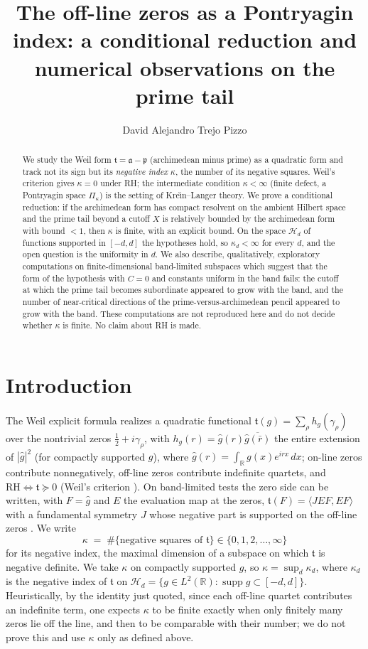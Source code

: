 \documentclass[11pt]{amsart}
\title[The Pontryagin-Index Route]{The off-line zeros as a Pontryagin index: a conditional reduction and numerical observations on the prime tail}
\author{David Alejandro Trejo Pizzo}
\theoremstyle{definition}
\theoremstyle{remark}
\newcommand{\fa}{\mathfrak a}
\newcommand{\fp}{\mathfrak p}
\newcommand{\ft}{\mathfrak t}
\newcommand{\RH}{\mathrm{RH}}
\begin{document}
\begin{abstract}
We study the Weil form $\ft=\fa-\fp$ (archimedean minus prime) as a quadratic
form and track not its sign but its \emph{negative index} $\kappa$, the number
of its negative squares. Weil's criterion gives $\kappa=0$ under RH; the
intermediate condition $\kappa<\infty$ (finite defect, a Pontryagin space
$\Pi_\kappa$) is the setting of Kre\u\i n--Langer theory. We prove a
conditional reduction: if the archimedean form has compact resolvent on the
ambient Hilbert space and the prime tail beyond a cutoff $X$ is
relatively bounded by the archimedean form with bound $<1$, then $\kappa$ is
finite, with an explicit bound. On the space $\mathcal H_d$ of functions
supported in $[-d,d]$ the hypotheses hold, so $\kappa_d<\infty$ for every $d$,
and the open question is the uniformity in $d$. We also describe, qualitatively,
exploratory computations on finite-dimensional band-limited subspaces which
suggest that the form of the hypothesis with $C=0$ and constants uniform in the
band fails: the cutoff at which the prime tail becomes subordinate appeared to
grow with the band, and the number of near-critical directions of the
prime-versus-archimedean pencil appeared to grow with the band. These
computations are not reproduced here and do not decide whether $\kappa$ is
finite. No claim about RH is made.
\end{abstract}
\maketitle

\section{Introduction}
The Weil explicit formula \cite{Weil} realizes a quadratic functional
$\ft(g)=\sum_\rho h_g(\gamma_\rho)$ over the nontrivial zeros
$\tfrac12+i\gamma_\rho$, with $h_g(r)=\widehat g(r)\overline{\widehat g(\bar r)}$
the entire extension of $|\widehat g|^2$ (for compactly supported $g$), where
$\widehat g(r)=\int_{\mathbb R}g(x)e^{irx}\,dx$;
on-line zeros contribute nonnegatively, off-line zeros contribute indefinite
quartets, and $\RH\iff\ft\succeq0$ (Weil's criterion \cite{Weil}). On
band-limited tests the zero side can be written, with $F=\widehat g$ and $E$
the evaluation map at the zeros, $\ft(F)=\langle JEF,EF\rangle$
with a fundamental symmetry $J$ whose negative part is supported on the
off-line zeros \cite[Theorem~1.2]{P8}. We write
\[
\kappa\;=\;\#\{\text{negative squares of }\ft\}\in\{0,1,2,\dots,\infty\}
\]
for its negative index, the maximal dimension of a subspace on which $\ft$ is
negative definite. We take $\kappa$ on compactly supported $g$, so
$\kappa=\sup_d\kappa_d$, where $\kappa_d$ is the negative index of $\ft$ on
$\mathcal H_d=\{g\in L^2(\mathbb R):\operatorname{supp}g\subset[-d,d]\}$.
Heuristically, by the identity just quoted, since each off-line quartet
contributes an indefinite term, one expects $\kappa$ to be finite exactly when only finitely
many zeros lie off the line, and then to be comparable with their number; we
do not prove this and use $\kappa$ only as defined above.
\end{document}
